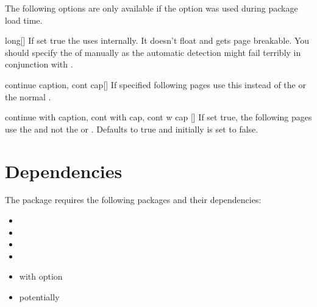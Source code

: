 The following options are only available if the  option was used
during package load time.

\begin{describeopt}{long}[]%
  If set true the  uses  internally. It doesn't
  float and gets page breakable. You should specify the  of
   manually as the automatic detection might fail terribly in
  conjunction with .
\end{describeopt}%
\begin{describeopt}{continue caption, cont cap}[]%
  If specified following pages use this  instead of the  or the normal .
\end{describeopt}%
\begin{describeopt}{continue with caption, cont with cap, cont w cap}%
  []
  If set true, the following pages use the  and not the  or . Defaults to true and initially is set to
  false.
\end{describeopt}%

\section{Dependencies}%
The package requires the following packages and their dependencies:
\vspace*{-\multicolsep}%
\begin{multicols}{3}
  \begin{itemize}
    \item {}
    \item {}
    \item {}
    \item {}
    \item {} with option 
    \item potentially 
  \end{itemize}
\end{multicols}
\vspace*{-\multicolsep}%
